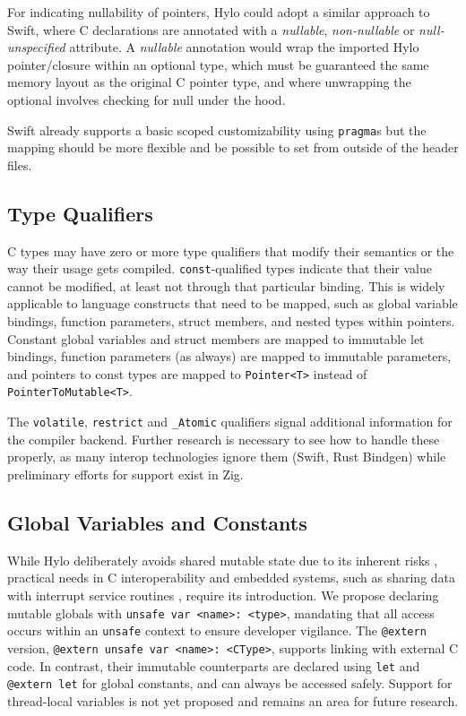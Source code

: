 For indicating nullability of pointers, Hylo could adopt a similar approach to Swift\cite{how-swift-imports-c-nullable}, where C declarations are annotated with a \textit{nullable}, \textit{non-nullable} or \textit{null-unspecified} attribute. A \textit{nullable} annotation would wrap the imported Hylo pointer/closure within an optional type, which must be guaranteed the same memory layout as the original C pointer type, and where unwrapping the optional involves checking for null under the hood.

Swift already supports a basic scoped customizability using \texttt{pragma}s but the mapping should be more flexible and be possible to set from outside of the header files.

\subsection{Type Qualifiers}
C types may have zero or more type qualifiers that modify their semantics or the way their usage gets compiled. \texttt{const}-qualified types indicate that their value cannot be modified, at least not through that particular binding. This is widely applicable to language constructs that need to be mapped, such as global variable bindings, function parameters, struct members, and nested types within pointers. Constant global variables and struct members are mapped to immutable let bindings, function parameters (as always) are mapped to immutable parameters, and pointers to const types are mapped to \texttt{Pointer<T>} instead of \texttt{PointerToMutable<T>}.

The \texttt{volatile}, \texttt{restrict} and \texttt{\_Atomic} qualifiers signal additional information for the compiler backend. Further research is necessary to see how to handle these properly, as many interop technologies ignore them (Swift, Rust Bindgen) while preliminary efforts for support exist in Zig\cite{zig-qualifiers}.

\subsection{Global Variables and Constants}
While Hylo deliberately avoids shared mutable state due to its inherent risks \cite{sharedmut}\cite{shared-mutable-state}, practical needs in C interoperability and embedded systems, such as sharing data with interrupt service routines \cite{rust-embedded-pain}, require its introduction. We propose declaring mutable globals with \texttt{unsafe var <name>: <type>}, mandating that all access occurs within an \texttt{unsafe} context to ensure developer vigilance. The \texttt{@extern} version, \texttt{@extern unsafe var <name>: <CType>}, supports linking with external C code. In contrast, their immutable counterparts are declared using \texttt{let} and \texttt{@extern let} for global constants, and can always be accessed safely. Support for thread-local variables is not yet proposed and remains an area for future research.

